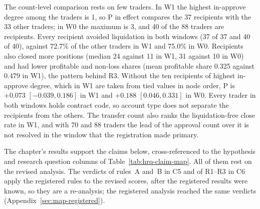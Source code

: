 

The count-level comparison rests on few traders. In W1 the highest in-approve degree among the traders is 1, so P in effect compares the 37 recipients with the 33 other traders; in W0 the maximum is 3, and 40 of the 88 traders are recipients. Every recipient avoided liquidation in both windows (37 of 37 and 40 of 40), against 72.7\% of the other traders in W1 and 75.0\% in W0. Recipients also closed more positions (median 24 against 11 in W1, 31 against 10 in W0) and had lower profitable and non-loss shares (mean profitable share 0.325 against 0.479 in W1), the pattern behind R3. Without the ten recipients of highest in-approve degree, which in W1 are taken from tied values in node order, P is $+0.073$ $[-0.039,0.186]$ in W1 and $+0.188$ $[0.046,0.331]$ in W0. Every trader in both windows holds contract code, so account type does not separate the recipients from the others. The transfer count also ranks the liquidation-free close rate in W1, and with 70 and 88 traders the lead of the approval count over it is not resolved in the window that the registration made primary.


The chapter's results support the claims below, cross-referenced to the hypothesis and research question columns of Table~\ref{tab:hrq-claim-map}. All of them rest on the revised analysis. The verdicts of rules~A and~B in C5 and of R1--R3 in C6 apply the registered rules to the revised scores, after the registered results were known, so they are a re-analysis; the registered analysis reached the same verdicts (Appendix~\ref{sec:map-registered}).


